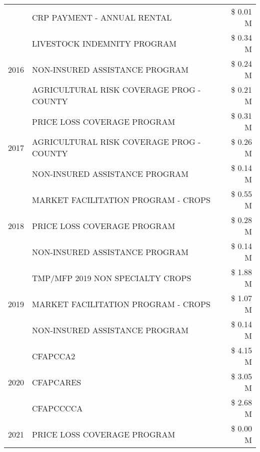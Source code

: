 \begin{tabular}{llr}
 & CRP PAYMENT - ANNUAL RENTAL & \$ 0.01 M \\
\cline{1-3}
\multirow[t]{3}{*}{2016} & LIVESTOCK INDEMNITY PROGRAM & \$ 0.34 M \\
 & NON-INSURED ASSISTANCE PROGRAM & \$ 0.24 M \\
 & AGRICULTURAL RISK COVERAGE PROG - COUNTY & \$ 0.21 M \\
\cline{1-3}
\multirow[t]{3}{*}{2017} & PRICE LOSS COVERAGE PROGRAM & \$ 0.31 M \\
 & AGRICULTURAL RISK COVERAGE PROG - COUNTY & \$ 0.26 M \\
 & NON-INSURED ASSISTANCE PROGRAM & \$ 0.14 M \\
\cline{1-3}
\multirow[t]{3}{*}{2018} & MARKET FACILITATION PROGRAM - CROPS & \$ 0.55 M \\
 & PRICE LOSS COVERAGE PROGRAM & \$ 0.28 M \\
 & NON-INSURED ASSISTANCE PROGRAM & \$ 0.14 M \\
\cline{1-3}
\multirow[t]{3}{*}{2019} & TMP/MFP 2019 NON SPECIALTY CROPS & \$ 1.88 M \\
 & MARKET FACILITATION PROGRAM - CROPS & \$ 1.07 M \\
 & NON-INSURED ASSISTANCE PROGRAM & \$ 0.14 M \\
\cline{1-3}
\multirow[t]{3}{*}{2020} & CFAPCCA2 & \$ 4.15 M \\
 & CFAPCARES & \$ 3.05 M \\
 & CFAPCCCCA & \$ 2.68 M \\
\cline{1-3}
2021 & PRICE LOSS COVERAGE PROGRAM & \$ 0.00 M \\
\cline{1-3}
\bottomrule
\end{tabular}
